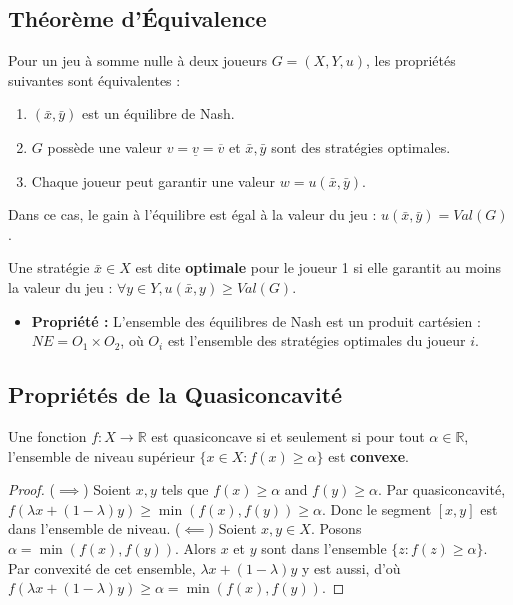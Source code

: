 \subsection{Théorème d'Équivalence}

\begin{theorem}
Pour un jeu à somme nulle à deux joueurs $G = (X, Y, u)$, les propriétés suivantes sont équivalentes :
\begin{enumerate}[label=(\roman*)]
    \item $(\bar{x}, \bar{y})$ est un équilibre de Nash.
    \item $G$ possède une valeur $v = \underline{v} = \overline{v}$ et $\bar{x}, \bar{y}$ sont des stratégies optimales.
    \item Chaque joueur peut garantir une valeur $w = u(\bar{x}, \bar{y})$.
\end{enumerate}
Dans ce cas, le gain à l'équilibre est égal à la valeur du jeu : $u(\bar{x}, \bar{y}) = Val(G)$.
\end{theorem}

\begin{definition}
Une stratégie $\bar{x} \in X$ est dite \textbf{optimale} pour le joueur 1 si elle garantit au moins la valeur du jeu : $\forall y \in Y, u(\bar{x}, y) \ge Val(G)$.
\end{definition}

\begin{itemize}
    \item \textbf{Propriété :} L'ensemble des équilibres de Nash est un produit cartésien : $NE = O_1 \times O_2$, où $O_i$ est l'ensemble des stratégies optimales du joueur $i$.
\end{itemize}

\subsection{Propriétés de la Quasiconcavité}

\begin{proposition}
Une fonction $f: X \rightarrow \mathbb{R}$ est quasiconcave si et seulement si pour tout $\alpha \in \mathbb{R}$, l'ensemble de niveau supérieur $\{x \in X : f(x) \ge \alpha\}$ est \textbf{convexe}.
\end{proposition}

\begin{proof}
($\implies$) Soient $x, y$ tels que $f(x) \ge \alpha$ and $f(y) \ge \alpha$. Par quasiconcavité, $f(\lambda x + (1-\lambda)y) \ge \min(f(x), f(y)) \ge \alpha$. Donc le segment $[x,y]$ est dans l'ensemble de niveau.
($\impliedby$) Soient $x, y \in X$. Posons $\alpha = \min(f(x), f(y))$. Alors $x$ et $y$ sont dans l'ensemble $\{z : f(z) \ge \alpha\}$. Par convexité de cet ensemble, $\lambda x + (1-\lambda)y$ y est aussi, d'où $f(\lambda x + (1-\lambda)y) \ge \alpha = \min(f(x), f(y))$.
\end{proof}

